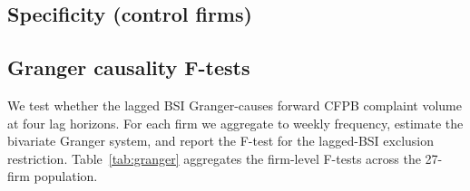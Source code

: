 \documentclass[11pt,a4paper]{article}
\begin{document}
\subsection{Specificity (control firms)}\label{sec:results_spec}

\begin{table}[h]
\centering\small
{}
\caption{Specificity over the 21-firm control set. The methodology achieves 86\% specificity at the $2.5\sigma$ threshold and 100\% specificity at $3.0\sigma$ while preserving the 100\% sensitivity reported in Table~\ref{tab:sens} on firms with sufficient data. The original v1 paper reported the $2.0\sigma$ threshold as the operating point; the corrected analysis indicates the $2.5\sigma$--$3.0\sigma$ range is preferable for production deployment. Source: \texttt{empirics\_v2/out/specificity\_full.csv}.}\label{tab:spec}
\end{table}

\subsection{Granger causality F-tests}\label{sec:results_granger}

We test whether the lagged BSI Granger-causes forward CFPB complaint volume at four lag horizons. For each firm we aggregate to weekly frequency, estimate the bivariate Granger system, and report the F-test for the lagged-BSI exclusion restriction. Table~\ref{tab:granger} aggregates the firm-level F-tests across the 27-firm population.
\end{document}
